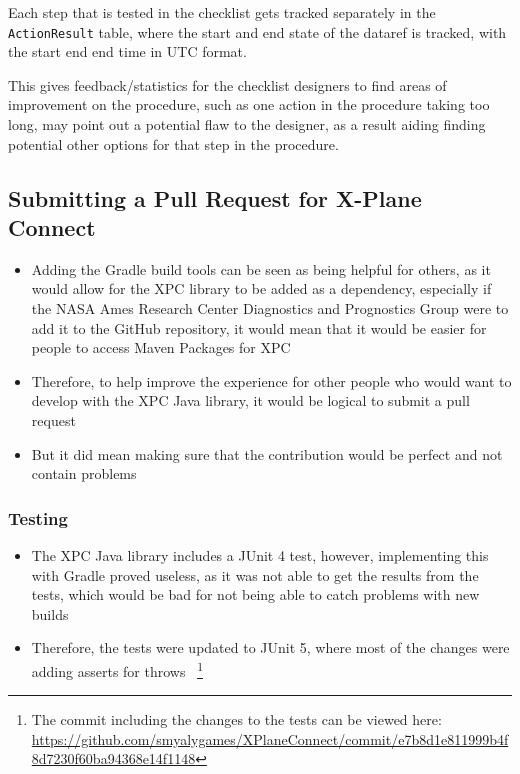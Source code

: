 \documentclass[../dissertation.tex]{subfiles}
\begin{document}
Each step that is tested in the checklist gets tracked separately in
the \lstinline|ActionResult| table, where the start and end state of the dataref
is tracked, with the start end end time in UTC format.

This gives feedback/statistics for the checklist designers to find
areas of improvement on the procedure, such as one action in the
procedure taking too long, may point out a potential flaw to the designer,
as a result aiding finding potential other options for that step in the procedure.

\subsection{Submitting a Pull Request for X-Plane Connect}
\begin{itemize}
  \item Adding the Gradle build tools can be seen as being helpful
    for others, as it would allow for the XPC library to be added
    as a dependency, especially if the NASA Ames Research Center Diagnostics and Prognostics Group
    were to add it to the GitHub repository, it would mean that it would be easier for
    people to access Maven Packages for XPC
  \item Therefore, to help improve the experience for other people who would want
    to develop with the XPC Java library, it would be logical to submit a
    pull request
  \item But it did mean making sure that the contribution would be perfect and not contain problems %
\end{itemize}

\subsubsection{Testing}
\begin{itemize}
  \item The XPC Java library includes a JUnit 4 test, however, implementing this
    with Gradle proved useless, as it was not able to get the results from the
    tests, which would be bad for not being able to catch problems with new builds
  \item Therefore, the tests were updated to JUnit 5, where most of the changes were
    adding asserts for throws~\cite{junit:migrate}
    \footnote{The commit including the changes to the tests can be viewed here:
    \url{https://github.com/smyalygames/XPlaneConnect/commit/e7b8d1e811999b4f8d7230f60ba94368e14f1148}}
\end{itemize}
\end{document}
